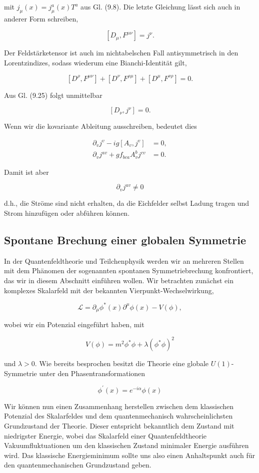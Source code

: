 \documentclass[10pt, letterpaper]{article}
\begin{document}
mit $j_{\mu}(x)=j_{\mu}^{a}(x) T^{a}$ aus Gl. (9.8). Die letzte Gleichung lässt sich auch in anderer Form schreiben,

$$
\left[D_{\mu}, F^{\mu \nu}\right]=j^{\nu} .
$$

Der Feldstärketensor ist auch im nichtabelschen Fall antisymmetrisch in den Lorentzindizes, sodass wiederum eine Bianchi-Identität gilt,

$$
\left[D^{\rho}, F^{\mu \nu}\right]+\left[D^{\nu}, F^{\rho \mu}\right]+\left[D^{\mu}, F^{\nu \rho}\right]=0 .
$$

Aus Gl. (9.25) folgt unmittelbar

$$
\left[D_{\nu}, j^{\nu}\right]=0 .
$$

Wenn wir die kovariante Ableitung ausschreiben, bedeutet dies

$$
\begin{aligned}
\partial_{v} j^{v}-i g\left[A_{v}, j^{v}\right] & =0, \\
\partial_{v} j^{a v}+g f_{b c a} A_{v}^{b} j^{c v} & =0 .
\end{aligned}
$$

Damit ist aber

$$
\partial_{v} j^{a v} \neq 0
$$

d.h., die Ströme sind nicht erhalten, da die Eichfelder selbst Ladung tragen und Strom hinzufügen oder abführen können.

\subsection*{Spontane Brechung einer globalen Symmetrie}
In der Quantenfeldtheorie und Teilchenphysik werden wir an mehreren Stellen mit dem Phänomen der sogenannten spontanen Symmetriebrechung konfrontiert, das wir in diesem Abschnitt einführen wollen. Wir betrachten zunächst ein komplexes Skalarfeld mit der bekannten Vierpunkt-Wechselwirkung,

$$
\mathscr{L}=\partial_{\mu} \phi^{*}(x) \partial^{\mu} \phi(x)-V(\phi),
$$

wobei wir ein Potenzial eingeführt haben, mit

$$
V(\phi)=m^{2} \phi^{*} \phi+\lambda\left(\phi^{*} \phi\right)^{2}
$$

und $\lambda>0$. Wie bereits besprochen besitzt die Theorie eine globale $U(1)$-Symmetrie unter den Phasentransformationen

$$
\phi^{\prime}(x)=e^{-i \alpha} \phi(x)
$$

Wir können nun einen Zusammenhang herstellen zwischen dem klassischen Potenzial des Skalarfeldes und dem quantenmechanisch wahrscheinlichsten Grundzustand der Theorie. Dieser entspricht bekanntlich dem Zustand mit niedrigster Energie, wobei das Skalarfeld einer Quantenfeldtheorie Vakuumfluktuationen um den klassischen Zustand minimaler Energie ausführen wird. Das klassische Energieminimum sollte uns also einen Anhaltspunkt auch für den quantenmechanischen Grundzustand geben.
\end{document}
